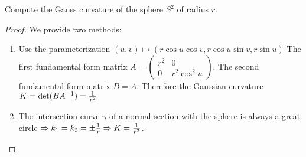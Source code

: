 \begin{problem}
Compute the Gauss curvature of the sphere $S^2$ of radius $r$.
\end{problem}
\begin{solution}
\begin{proof}
We provide two methods:
\begin{enumerate}
\item Use the parameterization $(u,v)\longmapsto (r\cos u \cos v,r\cos u \sin v,r\sin u)$
The first fundamental form matrix $A = \begin{pmatrix} r^2 & 0 \\ 0 & r^2\cos^2 u \end{pmatrix}$.
The second fundamental form matrix $B = A$.
Therefore the Gaussian curvature $K=\det(BA^{-1})={1 \over r^2}$
\item The intersection curve $\gamma $ of a normal section with the sphere is always a great circle $\Rightarrow k_1 =k_2 =\pm {1\over r} \Rightarrow K= {1\over r^2}$. 
\end{enumerate}
\end{proof}
\end{solution}

